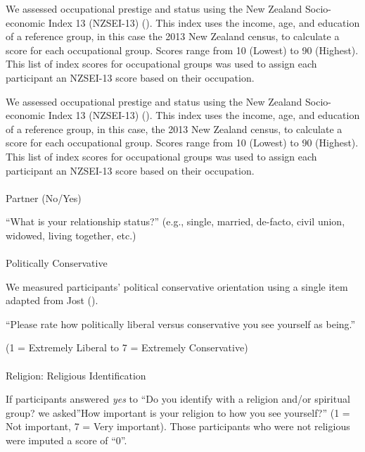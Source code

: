\documentclass[
  single column]{article}
\makeatletter
\let\oldparagraph\paragraph
\renewcommand{\paragraph}{
    \@ifstar
      \xxxParagraphStar
      \xxxParagraphNoStar
  }
\newcommand{\xxxParagraphStar}[1]{\oldparagraph*{#1}\mbox{}}
\newcommand{\xxxParagraphNoStar}[1]{\oldparagraph{#1}\mbox{}}
\makeatother
\begin{document}
We assessed occupational prestige and status using the New Zealand
Socio-economic Index 13 (NZSEI-13) (). This index uses the income, age, and education of
a reference group, in this case the 2013 New Zealand census, to
calculate a score for each occupational group. Scores range from 10
(Lowest) to 90 (Highest). This list of index scores for occupational
groups was used to assign each participant an NZSEI-13 score based on
their occupation.

We assessed occupational prestige and status using the New Zealand
Socio-economic Index 13 (NZSEI-13) (). This index uses the income, age, and education of
a reference group, in this case, the 2013 New Zealand census, to
calculate a score for each occupational group. Scores range from 10
(Lowest) to 90 (Highest). This list of index scores for occupational
groups was used to assign each participant an NZSEI-13 score based on
their occupation.

\paragraph{Partner (No/Yes)}\label{partner-noyes}

``What is your relationship status?'' (e.g., single, married, de-facto,
civil union, widowed, living together, etc.)

\paragraph{Politically Conservative}\label{politically-conservative}

We measured participants' political conservative orientation using a
single item adapted from Jost ().

``Please rate how politically liberal versus conservative you see
yourself as being.''

(1 = Extremely Liberal to 7 = Extremely Conservative)

\paragraph{Religion: Religious
Identification}\label{religion-religious-identification}

If participants answered \emph{yes} to ``Do you identify with a religion
and/or spiritual group? we asked''How important is your religion to how
you see yourself?'' (1 = Not important, 7 = Very important). Those
participants who were not religious were imputed a score of ``0''.
\end{document}
